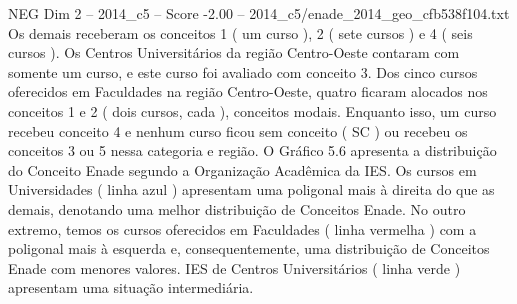 \begin{textsample}{NEG Dim 2 – 2014\_c5 – Score -2.00 – 2014\_c5/enade\_2014\_geo\_cfb538f104.txt}
Os demais receberam os conceitos 1 ( um curso ), 2 ( sete cursos ) e 4 ( seis cursos ).
Os Centros Universitários da região Centro-Oeste contaram com somente um curso, e este curso foi avaliado com conceito 3.
Dos cinco cursos oferecidos em Faculdades na região Centro-Oeste, quatro ficaram alocados nos conceitos 1 e 2 ( dois cursos, cada ), conceitos modais.
Enquanto isso, um curso recebeu conceito 4 e nenhum curso ficou sem conceito ( SC ) ou recebeu os conceitos 3 ou 5 nessa categoria e região.
O Gráfico 5.6 apresenta a distribuição do Conceito Enade segundo a Organização Acadêmica da IES.
Os cursos em Universidades ( linha azul ) apresentam uma poligonal mais à direita do que as demais, denotando uma melhor distribuição de Conceitos Enade.
No outro extremo, temos os cursos oferecidos em Faculdades ( linha vermelha ) com a poligonal mais à esquerda e, consequentemente, uma distribuição de Conceitos Enade com menores valores.
IES de Centros Universitários ( linha verde ) apresentam uma situação intermediária.

\end{textsample}
